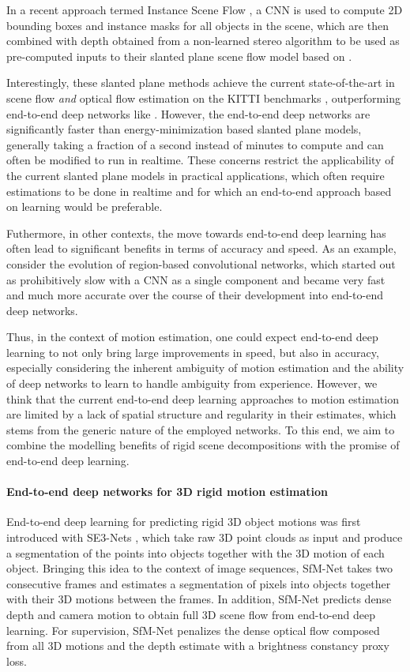 In a recent approach termed Instance Scene Flow \cite{InstanceSceneFlow},
a CNN is used to compute 2D bounding boxes and instance masks for all objects in the scene, which are then combined
with depth obtained from a non-learned stereo algorithm to be used as pre-computed
inputs to their slanted plane scene flow model based on \cite{KITTI2015}.

Interestingly, these slanted plane methods achieve the current state-of-the-art
in scene flow \emph{and} optical flow estimation on the KITTI benchmarks \cite{KITTI2012, KITTI2015},
outperforming end-to-end deep networks like \cite{FlowNet2, SceneFlowDataset}.
However, the end-to-end deep networks are significantly faster than energy-minimization based slanted plane models,
generally taking a fraction of a second instead of minutes to compute and can often be modified to run in realtime.
These concerns restrict the applicability of the current slanted plane models in practical applications,
which often require estimations to be done in realtime and for which an end-to-end
approach based on learning would be preferable.

Futhermore, in other contexts, the move towards end-to-end deep learning has often lead
to significant benefits in terms of accuracy and speed.
As an example, consider the evolution of region-based convolutional networks, which started
out as prohibitively slow with a CNN as a single component and
became very fast and much more accurate over the course of their development into
end-to-end deep networks.

Thus, in the context of motion estimation, one could expect end-to-end deep learning to not only bring large improvements
in speed, but also in accuracy, especially considering the inherent ambiguity of motion estimation
and the ability of deep networks to learn to handle ambiguity from experience. %
However, we think that the current end-to-end deep learning approaches to motion
estimation are limited by a lack of spatial structure and regularity in their estimates,
which stems from the generic nature of the employed networks.
To this end, we aim to combine the modelling benefits of rigid scene decompositions
with the promise of end-to-end deep learning.


\paragraph{End-to-end deep networks for 3D rigid motion estimation}
End-to-end deep learning for predicting rigid 3D object motions was first introduced with
SE3-Nets \cite{SE3Nets}, which take raw 3D point clouds as input and produce a segmentation
of the points into objects together with the 3D motion of each object.
Bringing this idea to the context of image sequences, SfM-Net \cite{SfmNet} takes two consecutive frames and
estimates a segmentation of pixels into objects together with their 3D motions between the frames.
In addition, SfM-Net predicts dense depth and camera motion to obtain full 3D scene flow from end-to-end deep learning.
For supervision, SfM-Net penalizes the dense optical flow composed from all 3D motions and the depth estimate
with a brightness constancy proxy loss.
